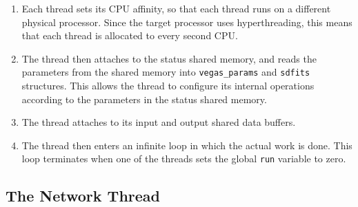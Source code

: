 \documentclass[11pt]{article} %
\begin{document}
\begin{enumerate}
\item Each thread sets its CPU affinity, so that each thread runs on a different physical processor. Since the target processor uses hyperthreading, this means that each thread is allocated to every second CPU.
\item The thread then attaches to the status shared memory, and reads the parameters from the shared memory into \texttt{vegas\_params} and \texttt{sdfits} structures. This allows the thread to configure its internal operations according to the parameters in the status shared memory.
\item The thread attaches to its input and output shared data buffers.
\item The thread then enters an infinite loop in which the actual work is done. This loop terminates when one of the threads sets the global \texttt{run} variable to zero.
\end{enumerate}

\subsection{The Network Thread}
\end{document}

